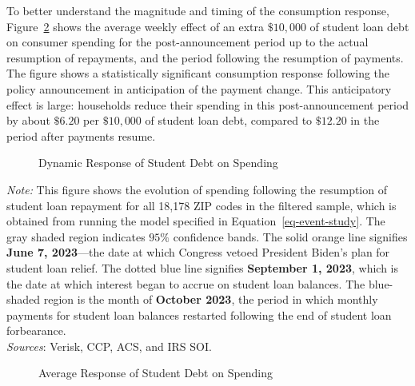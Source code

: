 \documentclass[
  letterpaper,
  DIV=11,
  numbers=noendperiod]{scrartcl}
\begin{document}
To better understand the magnitude and timing of the consumption
response, Figure~\ref{fig-credit-avg} shows the average weekly effect of
an extra \(\$10,000\) of student loan debt on consumer spending for the
post-announcement period up to the actual resumption of repayments, and
the period following the resumption of payments. The figure shows a
statistically significant consumption response following the policy
announcement in anticipation of the payment change. This anticipatory
effect is large: households reduce their spending in this
post-announcement period by about \(\$6.20\) per \(\$10,000\) of student
loan debt, compared to \(\$12.20\) in the period after payments resume.

\begin{figure}

\caption{\label{fig-credit-png}Dynamic Response of Student Debt on
Spending}


\end{figure}%

\emph{Note:} This figure shows the evolution of spending following the
resumption of student loan repayment for all 18,178 ZIP codes in the
filtered sample, which is obtained from running the model specified in
Equation~\ref{eq-event-study}. The gray shaded region indicates \(95\%\)
confidence bands. The solid {orange} line signifies \textbf{June 7,
2023}---the date at which Congress vetoed President Biden's plan for
student loan relief. The dotted {blue} line signifies \textbf{September
1, 2023}, which is the date at which interest began to accrue on student
loan balances. The blue-shaded region is the month of \textbf{October
2023}, the period in which monthly payments for student loan balances
restarted following the end of student loan forbearance.\\
\emph{Sources}: Verisk, CCP, ACS, and IRS SOI.

\begin{figure}

\caption{\label{fig-credit-avg}Average Response of Student Debt on
Spending}


\end{figure}%
\end{document}
